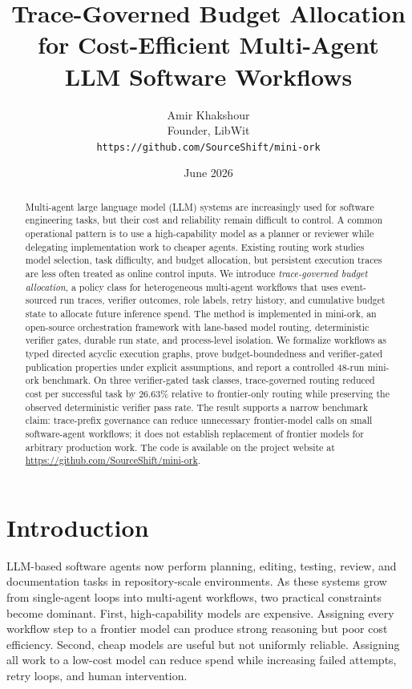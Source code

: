 \documentclass[11pt]{article}
\title{Trace-Governed Budget Allocation for Cost-Efficient Multi-Agent LLM Software Workflows}
\author{Amir Khakshour\\
Founder, LibWit\\
\texttt{https://github.com/SourceShift/mini-ork}}
\date{June 2026}
\begin{document}
\maketitle

\begin{abstract}
Multi-agent large language model (LLM) systems are increasingly used for
software engineering tasks, but their cost and reliability remain difficult to
control. A common operational pattern is to use a high-capability model as a
planner or reviewer while delegating implementation work to cheaper agents.
Existing routing work studies model selection, task difficulty, and budget
allocation, but persistent execution traces are less often treated as online
control inputs. We introduce \emph{trace-governed budget allocation}, a policy
class for heterogeneous multi-agent workflows that uses event-sourced run
traces, verifier outcomes, role labels, retry history, and cumulative budget
state to allocate future inference spend. The method is implemented in
mini-ork, an open-source orchestration framework with lane-based model routing,
deterministic verifier gates, durable run state, and process-level isolation.
We formalize workflows as typed directed acyclic execution graphs, prove
budget-boundedness and verifier-gated publication properties under explicit
assumptions, and report a controlled 48-run mini-ork benchmark. On three
verifier-gated task classes, trace-governed routing reduced cost per successful
task by 26.63\% relative to frontier-only routing while preserving the observed
deterministic verifier pass rate. The result supports a narrow benchmark claim:
trace-prefix governance can reduce unnecessary frontier-model calls on small
software-agent workflows; it does not establish replacement of frontier models
for arbitrary production work. The code is available on the project website at
\url{https://github.com/SourceShift/mini-ork}.
\end{abstract}

\section{Introduction}

LLM-based software agents now perform planning, editing, testing, review, and
documentation tasks in repository-scale environments. As these systems grow from
single-agent loops into multi-agent workflows, two practical constraints become
dominant. First, high-capability models are expensive. Assigning every workflow
step to a frontier model can produce strong reasoning but poor cost efficiency.
Second, cheap models are useful but not uniformly reliable. Assigning all work
to a low-cost model can reduce spend while increasing failed attempts, retry
loops, and human intervention.
\end{document}
